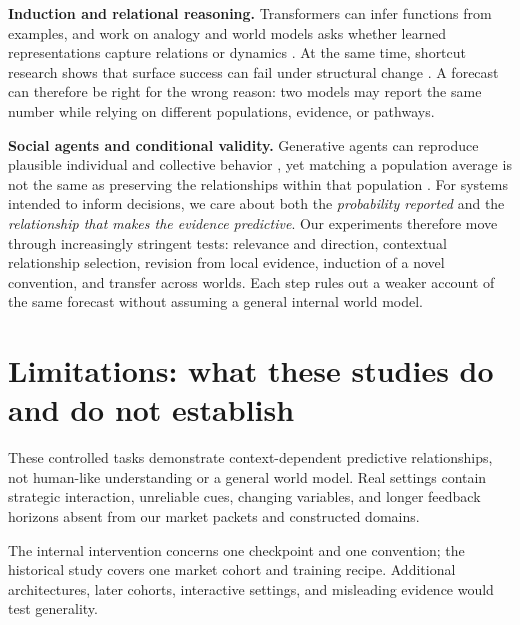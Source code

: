 \documentclass{article}
\begin{document}
\noindent\textbf{Induction and relational reasoning.}
Transformers can infer functions from examples, and work on analogy and world
models asks whether learned representations capture relations or dynamics
\citep{garg2022what,chan2022data,webb2023emergent,yasunaga2024large,ha2018world,lecun2022path,li2023emergent}.
At the same time, shortcut research shows that surface success can fail under
structural change
\citep{geirhos2020shortcut,mitchell2023ai,vafa2025foundation}. A forecast can
therefore be right for the wrong reason: two models may report the same number
while relying on different populations, evidence, or pathways.

\noindent\textbf{Social agents and conditional validity.}
Generative agents can reproduce plausible individual and collective behavior
\citep{park2023generative,aher2023simulate,argyle2023out}, yet matching a
population average is not the same as preserving the relationships within that
population \citep{bisbee2024synthetic}. For systems intended to inform decisions,
we care about both the \emph{probability reported} and the \emph{relationship
that makes the evidence predictive}. Our experiments therefore move through
increasingly stringent tests: relevance and direction, contextual relationship
selection, revision from local evidence, induction of a novel convention, and
transfer across worlds. Each step rules out a weaker account of the same
forecast without assuming a general internal world model.
\section{Limitations: what these studies do and do not establish}
\label{sec:limitations}

These controlled tasks demonstrate context-dependent predictive relationships,
not human-like understanding or a general world model. Real settings contain
strategic interaction, unreliable cues, changing variables, and longer feedback
horizons absent from our market packets and constructed domains.

The internal intervention concerns one checkpoint and one convention; the
historical study covers one market cohort and training recipe. Additional
architectures, later cohorts, interactive settings, and misleading evidence
would test generality.
\end{document}
